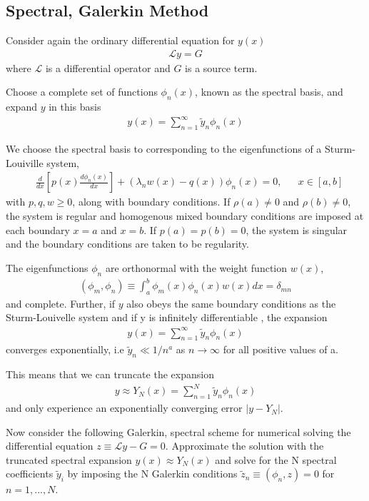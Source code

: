 \documentclass[aps,prd,amsmath,showpacs,amssymb,superscriptaddress,nofootinbib,longbibliography,eqsecnum,preprintnumbers]{revtex4-1}
\begin{document}
\subsection{Spectral, Galerkin Method}
Consider again the ordinary differential equation for $y(x)$
\begin{align}
\mathcal{L} y = G \label{eq:ODE}
\end{align}
where $\mathcal L$ is a differential operator and $G$ is a source term.

Choose a complete set of functions ${\phi_n(x)}$, known as the spectral basis, and expand $y$ in this basis
\begin{align}
y(x)=\sum_{n=1}^\infty\tilde y_n\phi_n(x)
\end{align}

We choose the spectral basis to corresponding to the eigenfunctions of a Sturm-Louiville system,
\begin{align}
&\frac{d}{dx}\left[p(x)\frac{d\phi_n(x)}{dx}\right]+(\lambda_n w(x)-q(x))\phi_n(x)=0,& &x\in[a,b]
\end{align}
with $p,q,w\geq 0$, along with boundary conditions. If $\rho(a)\neq 0$ and $\rho(b)\neq 0$, the system is regular and homogenous mixed boundary conditions are imposed at each boundary $x=a$ and $x=b$. If $p(a)=p(b)=0$, the system is singular and the boundary conditions are taken to be regularity.

The eigenfunctions $\phi_n$ are orthonormal with the weight function $w(x)$,
\begin{align}
(\phi_m,\phi_n)\equiv \int_a^b\phi_m(x)\phi_n(x)w(x)dx =\delta_{mn}
\end{align}
and complete. Further, if $y$ also obeys the same boundary conditions as the Sturm-Louivelle system and if y is infinitely differentiable , the expansion
\begin{align}
y(x)=\sum_{n=1}^\infty \tilde y_n \phi_n(x)
\end{align}
converges exponentially, i.e $\tilde y_n \ll 1/n^a$ as $n\to \infty$ for all positive values of a. 

This means that we can truncate the expansion 
\begin{align}
y\approx Y_N(x)=\sum_{n=1}^N\tilde y_n\phi_n(x)
\end{align}
and only experience an exponentially converging error $|y-Y_N|$.

Now consider the following Galerkin, spectral scheme for numerical solving the differential equation $z\equiv \mathcal L y-G=0$. Approximate the solution with the truncated spectral expansion $y(x)\approx Y_N(x)$ and solve for the N spectral coefficients ${\tilde y_i}$ by imposing the N Galerkin conditions $\tilde z_n\equiv (\phi_n, z)=0$ for $n=1,..., N$. 
\end{document}
